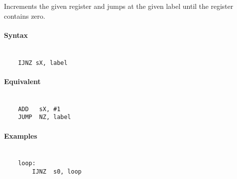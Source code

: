     Increments the given register and jumps at the given label until the register contains zero.

    \paragraph{Syntax}
        ~\\
        \verb'    IJNZ sX, label'

    \paragraph{Equivalent}
        ~\\
        \verb'    ADD   sX, #1'\\
        \verb'    JUMP  NZ, label'

    \paragraph{Examples}
        ~\\
        \verb'    loop:             '\\
        \verb'        IJNZ  s0, loop'
